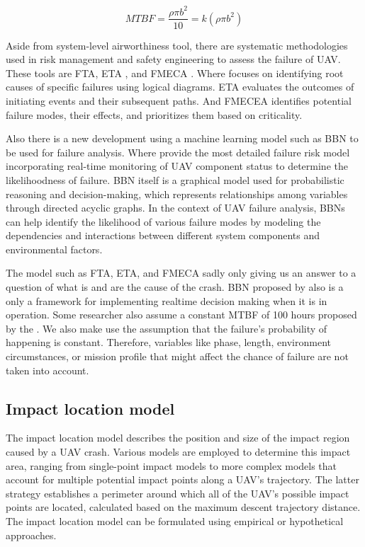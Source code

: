 \documentclass[12pt]{report}
\begin{document}
            \begin{equation}\label{eq:mtbf_metric}
                MTBF = \frac{\rho \pi b^2}{10} = k(\rho \pi b^2)
            \end{equation}

            Aside from system-level airworthiness tool, there are systematic methodologies used in risk management and
            safety engineering to assess the failure of UAV. These tools are \ac{FTA}, \ac{ETA} , and \ac{FMECA}
            \cite{barr_preliminary_2017}. Where focuses on identifying root causes of specific failures using logical
            diagrams. ETA evaluates the outcomes of initiating events and their subsequent paths. And FMECEA identifies
            potential failure modes, their effects, and prioritizes them based on criticality.

            Also there is a new development using a machine learning model such as \ac{BBN} \cite{ancel_real-time_2017}
            to be used for failure analysis. Where \cite{ancel_real-time_2017} provide the most detailed failure risk
            model incorporating real-time monitoring of UAV component status to determine the likelihoodness of failure.
            BBN itself is a graphical model used for probabilistic reasoning and decision-making, which represents
            relationships among variables through directed acyclic graphs. In the context of UAV failure analysis, BBNs
            can help identify the likelihood of various failure modes by modeling the dependencies and interactions
            between different system components and environmental factors.

            The model such as FTA, ETA, and FMECA sadly only giving us an answer to a question of what is and are the
            cause of the crash. BBN proposed by \cite{ancel_real-time_2017} also is a only a framework for implementing
            realtime decision making when it is in operation. Some researcher also assume a  constant MTBF of 100 hours
            proposed by the \cite{arc_unmanned_2015}.  We also make  use the assumption that the failure's probability
            of happening is constant. Therefore, variables like phase, length, environment circumstances, or mission
            profile that might affect the chance of failure are not taken into account.

        \subsection{Impact location model}
            The impact location model describes the position and size of the impact region caused by a UAV crash.
            Various models are employed to determine this impact area, ranging from single-point impact models to more
            complex models that account for multiple potential impact points along a UAV's trajectory. The latter
            strategy establishes a perimeter around which all of the UAV's possible impact points are located,
            calculated based on the maximum descent trajectory distance. The impact location model can be formulated
            using empirical or hypothetical approaches.
                
\end{document}
